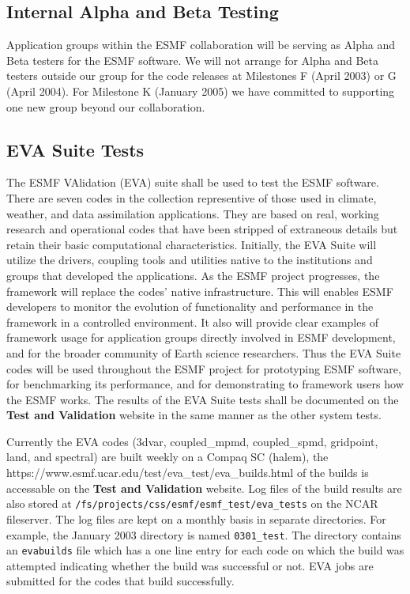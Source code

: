 \subsection{Internal Alpha and Beta Testing}

Application groups within the ESMF collaboration will be serving as Alpha 
and Beta testers for the ESMF software.  We will not arrange for Alpha
and Beta testers outside our group for the code releases at Milestones
F (April 2003) or G (April 2004).  For Milestone K (January 2005) we
have committed to supporting one new group beyond our collaboration.

\subsection{EVA Suite Tests}

The ESMF VAlidation (EVA) suite shall be used to test the ESMF software. There
are seven codes in the collection representive of those used in climate,
weather, and data assimilation applications. They are based on real,
working research and operational codes that have been stripped of
extraneous details but retain their basic computational 
characteristics.  Initially, the EVA Suite will utilize the
drivers, coupling tools and utilities native to the institutions and
groups that developed the applications.  As the ESMF project
progresses, the framework will replace the codes' native infrastructure.  This
will enables ESMF developers to monitor the evolution of functionality
and performance in the framework in a controlled environment.  It also
will provide clear examples of framework usage for application
groups directly involved in ESMF development, and for the
broader community of Earth science researchers.  Thus
the EVA Suite codes will be used throughout the
ESMF project for prototyping ESMF software, for benchmarking its
performance, and for demonstrating to framework users how the
ESMF works. The results of the EVA Suite tests shall be documented on
the {\bf Test and Validation} website in the same manner as the
other system tests.

Currently the EVA codes (3dvar, coupled\_mpmd, coupled\_spmd, gridpoint, land, and spectral) are 
built weekly on a Compaq SC (halem), the 
{https://www.esmf.ucar.edu/test/eva\_test/eva\_builds.html} of the builds
is accessable on the {\bf Test and Validation} website.
Log files of the build results are also stored at {\tt /fs/projects/css/esmf/esmf\_test/eva\_tests} on the NCAR fileserver.
The log files are kept on a monthly basis in
separate directories. For example, the January 2003 directory is named {\tt 0301\_test}. The
directory contains an {\tt eva\-builds} file which has a one line entry for each code on
which the build was attempted indicating whether the build was successful or not.
EVA jobs are submitted for the codes that build successfully.

